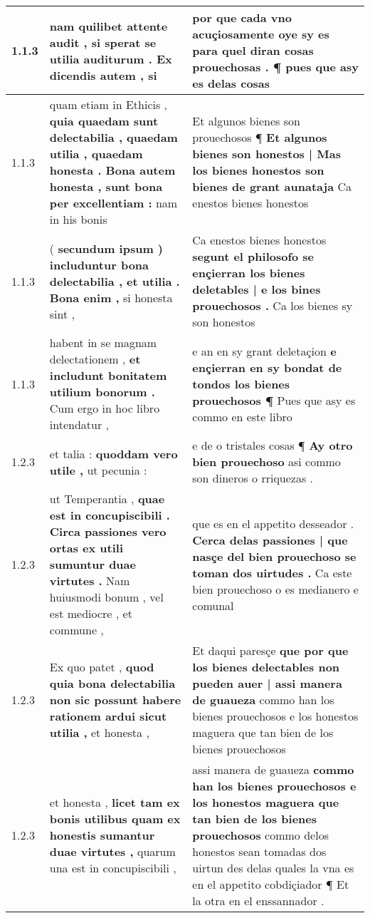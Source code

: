 \begin{tabular}{|p{1cm}|p{6.5cm}|p{6.5cm}|}

\hline
1.1.3 & nam quilibet attente audit , \textbf{ si sperat se utilia auditurum . Ex dicendis autem , } si & por que cada vno acuçiosamente oye \textbf{ sy es para quel diran cosas prouechosas . } ¶ pues que asy es delas cosas \\\hline
1.1.3 & quam etiam in Ethicis , \textbf{ quia quaedam sunt delectabilia , quaedam utilia , quaedam honesta . Bona autem honesta , sunt bona per excellentiam : } nam in his bonis & Et algunos bienes son prouechosos ¶ \textbf{ Et algunos bienes son honestos | Mas los bienes honestos son bienes de grant aunataja } Ca enestos bienes honestos \\\hline
1.1.3 & ( \textbf{ secundum ipsum ) includuntur bona delectabilia , et utilia . Bona enim , } si honesta sint , & Ca enestos bienes honestos \textbf{ segunt el philosofo se ençierran los bienes deletables | e los bines prouechosos . } Ca los bienes sy son honestos \\\hline
1.1.3 & habent in se magnam delectationem , \textbf{ et includunt bonitatem utilium bonorum . } Cum ergo in hoc libro intendatur , & e an en sy grant deletaçion \textbf{ e ençierran en sy bondat de tondos los bienes prouechosos ¶ } Pues que asy es commo en este libro \\\hline
1.2.3 & et talia : \textbf{ quoddam vero utile , } ut pecunia : & e de o tristales cosas ¶ \textbf{ Ay otro bien prouechoso } asi commo son dineros o rriquezas . \\\hline
1.2.3 & ut Temperantia , \textbf{ quae est in concupiscibili . Circa passiones vero ortas ex utili sumuntur duae virtutes . } Nam huiusmodi bonum , vel est mediocre , et commune , & que es en el appetito desseador . \textbf{ Cerca delas passiones | que nasçe del bien prouechoso se toman dos uirtudes . } Ca este bien prouechoso o es medianero e comunal \\\hline
1.2.3 & Ex quo patet , \textbf{ quod quia bona delectabilia non sic possunt habere rationem ardui sicut utilia , } et honesta , & Et daqui paresçe \textbf{ que por que los bienes delectables non pueden auer | assi manera de guaueza } commo han los bienes prouechosos e los honestos maguera que tan bien de los bienes prouechosos \\\hline
1.2.3 & et honesta , \textbf{ licet tam ex bonis utilibus quam ex honestis sumantur duae virtutes , } quarum una est in concupiscibili , & assi manera de guaueza \textbf{ commo han los bienes prouechosos e los honestos maguera que tan bien de los bienes prouechosos } commo delos honestos sean tomadas dos uirtun des delas quales la vna es en el appetito cobdiçiador ¶ Et la otra en el enssannador . \\\hline

\end{tabular}
